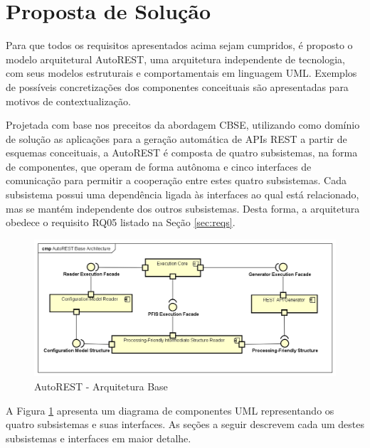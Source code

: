 
\section{Proposta de Solução}

Para que todos os requisitos apresentados acima sejam cumpridos, é proposto o modelo arquitetural AutoREST, uma arquitetura independente de tecnologia, com seus modelos estruturais e comportamentais em linguagem UML. Exemplos de possíveis concretizações dos componentes conceituais são apresentadas para motivos de contextualização.

Projetada com base nos preceitos da abordagem CBSE, utilizando como domínio de solução as aplicações para a geração automática de APIs REST a partir de esquemas conceituais, a AutoREST é composta de quatro subsistemas, na forma de componentes, que operam de forma autônoma e cinco interfaces de comunicação para permitir a cooperação entre estes quatro subsistemas. Cada subsistema possui uma dependência ligada às interfaces ao qual está relacionado, mas se mantém independente dos outros subsistemas. Desta forma, a arquitetura obedece o requisito RQ05 listado na Seção \ref{sec:reqs}.

\begin{figure}[htb]
    \begin{center}
        \includegraphics[scale=0.57]{imagens/AutoREST_Base_Architecture.png}
    \end{center}
	\caption{\label{fig_aba}AutoREST - Arquitetura Base}
\end{figure}

A Figura \ref{fig_aba} apresenta um diagrama de componentes UML representando os quatro subsistemas e suas interfaces. As seções a seguir descrevem cada um destes subsistemas e interfaces em maior detalhe.

